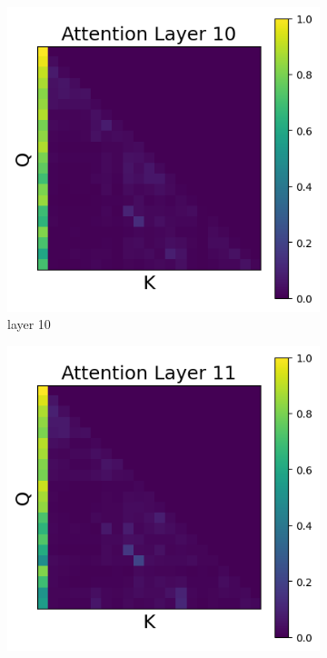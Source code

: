 \documentclass[11pt]{article}
\begin{document}
\begin{figure}[t]
    \begin{subfigure}[t]{0.24\textwidth}
    \centering
    \includegraphics[width=1.4\columnwidth]{figures/no_intervention/layer_10.png}
    \caption{layer 10}
  \end{subfigure}\hfill
    \begin{subfigure}[t]{0.24\textwidth}
    \centering
    \includegraphics[width=1.4\columnwidth]{figures/no_intervention/layer_11.png}

\end{subfigure}
\end{figure}
\end{document}
